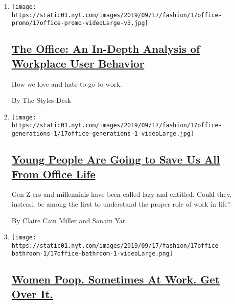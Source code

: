 \begin{enumerate}
\def\labelenumi{\arabic{enumi}.}
\item
  \texttt{[image: https://static01.nyt.com/images/2019/09/17/fashion/17office-promo/17office-promo-videoLarge-v3.jpg]}

  \hypertarget{the-office-an-in-depth-analysis-of-workplace-user-behavior}{%
  \subsection{\texorpdfstring{\href{/interactive/2019/09/17/style/the-office.html}{The
  Office: An In-Depth Analysis of Workplace User
  Behavior}}{The Office: An In-Depth Analysis of Workplace User Behavior}}\label{the-office-an-in-depth-analysis-of-workplace-user-behavior}}

  How we love and hate to go to work.

  By The Styles Desk
\item
  \texttt{[image: https://static01.nyt.com/images/2019/09/17/fashion/17office-generations-1/17office-generations-1-videoLarge.jpg]}

  \hypertarget{young-people-are-going-to-save-us-all-from-office-life}{%
  \subsection{\texorpdfstring{\href{/2019/09/17/style/generation-z-millennials-work-life-balance.html}{Young
  People Are Going to Save Us All From Office
  Life}}{Young People Are Going to Save Us All From Office Life}}\label{young-people-are-going-to-save-us-all-from-office-life}}

  Gen Z-ers and millennials have been called lazy and entitled. Could
  they, instead, be among the first to understand the proper role of
  work in life?

  By Claire Cain Miller and Sanam Yar
\item
  \texttt{[image: https://static01.nyt.com/images/2019/09/17/fashion/17office-bathroom-1/17office-bathroom-1-videoLarge.png]}

  \hypertarget{women-poop-sometimes-at-work-get-over-it}{%
  \subsection{\texorpdfstring{\href{/2019/09/17/style/women-poop-at-work.html}{Women
  Poop. Sometimes At Work. Get Over
  It.}}{Women Poop. Sometimes At Work. Get Over It.}}\label{women-poop-sometimes-at-work-get-over-it}}


\end{enumerate}
